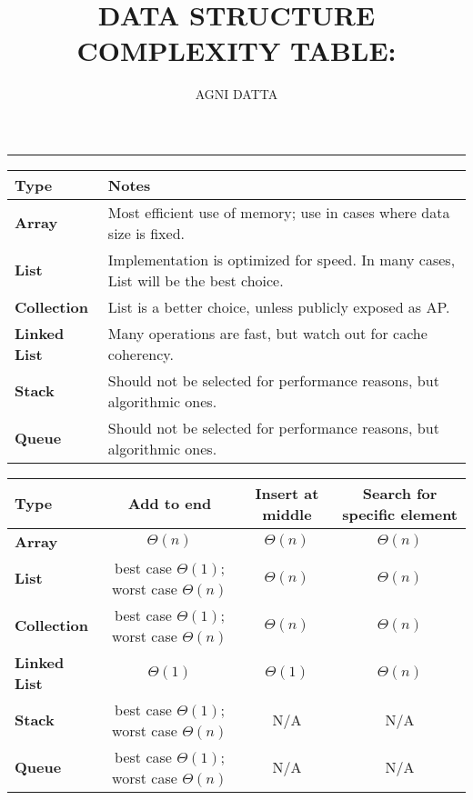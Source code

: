 \documentclass{article}
\providecommand{\tabularnewline}{\\}
\begin{document}
\title{\textbf{DATA STRUCTURE COMPLEXITY TABLE:}}
\author{AGNI DATTA}

\maketitle
\rule[0.5ex]{1\columnwidth}{1pt}

\bigskip{}

\begin{center}
{\small{}}%
\begin{tabular}{|l|l|}
\hline 
\textbf{\small{}Type} & \textbf{\small{}Notes}\tabularnewline
\hline 
\hline 
\textbf{\small{}Array} & {\small{}Most efficient use of memory; use in cases where data size
is fixed.}\tabularnewline
\hline 
\textbf{\small{}List} & {\small{}Implementation is optimized for speed. In many cases, List
will be the best choice.}\tabularnewline
\hline 
\textbf{\small{}Collection} & {\small{}List is a better choice, unless publicly exposed as AP.}\tabularnewline
\hline 
\textbf{\small{}Linked List} & {\small{}Many operations are fast, but watch out for cache coherency.}\tabularnewline
\hline 
\textbf{\small{}Stack} & {\small{}Should not be selected for performance reasons, but algorithmic
ones.}\tabularnewline
\hline 
\textbf{\small{}Queue} & {\small{}Should not be selected for performance reasons, but algorithmic
ones.}\tabularnewline
\hline 
\end{tabular}{\small\par}
\par\end{center}

\begin{center}
{\small{}\bigskip{}
}{\small\par}
\par\end{center}

\begin{center}
{\small{}}%
\begin{tabular}{|l|c|c|c|}
\hline 
\textbf{\small{}Type} & \textbf{\small{}Add to end} & \textbf{\small{}Insert at middle} & \textbf{\small{}Search for specific element}\tabularnewline
\hline 
\hline 
\textbf{\small{}Array} & {\small{}$\Theta(n)$} & {\small{}$\Theta(n)$} & {\small{}$\Theta(n)$}\tabularnewline
\hline 
\textbf{\small{}List} & {\small{}best case $\Theta(1)$; worst case $\Theta(n)$} & {\small{}$\Theta(n)$} & {\small{}$\Theta(n)$}\tabularnewline
\hline 
\textbf{\small{}Collection} & {\small{}best case $\Theta(1)$; worst case $\Theta(n)$} & {\small{}$\Theta(n)$} & {\small{}$\Theta(n)$}\tabularnewline
\hline 
\textbf{\small{}Linked List} & {\small{}$\Theta(1)$} & {\small{}$\Theta(1)$} & {\small{}$\Theta(n)$}\tabularnewline
\hline 
\textbf{\small{}Stack} & {\small{}best case $\Theta(1)$; worst case $\Theta(n)$} & {\small{}N/A } & {\small{}N/A }\tabularnewline
\hline 
\textbf{\small{}Queue} & {\small{}best case $\Theta(1)$; worst case $\Theta(n)$} & {\small{}N/A } & {\small{}N/A }\tabularnewline
\hline 
\end{tabular}{\small\par}
\par\end{center}
\end{document}
